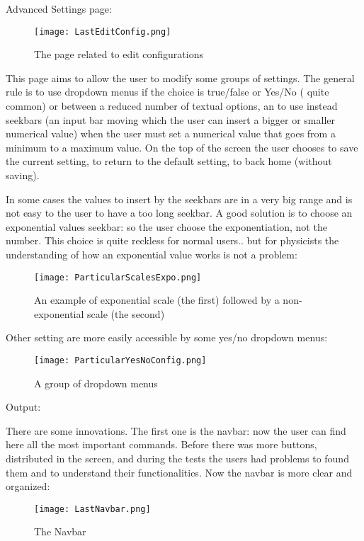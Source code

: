 Advanced Settings page:

\begin{figure}[H]
\centering
\texttt{[image: LastEditConfig.png]} 
\caption{The page related to edit configurations}
\end{figure}   

This page aims to allow the user to modify some groups of settings. The general rule is to use dropdown menus if the choice is true/false or Yes/No (	quite common) or between a reduced number of textual options, an to use instead  seekbars (an input bar moving which the user can insert a bigger or smaller numerical value) when the user must set a numerical value that goes from a minimum to a maximum value. On the top of the screen the user chooses to save the current setting, to return to the default setting, to back home (without saving).    

In some cases the values to insert by the seekbars are in a very big range and is not easy to the user to have a too long seekbar. A good solution is to choose an exponential values seekbar: so the user choose the exponentiation, not the number. This choice is quite reckless for normal users.. but for physicists the understanding of how an exponential value works is not a problem:

\begin{figure}[H]
\centering
\texttt{[image: ParticularScalesExpo.png]} 
\caption{ An example of exponential scale (the first) followed by a non-exponential scale (the second) }
\end{figure}  

Other setting are more easily accessible by some yes/no dropdown menus:


\begin{figure}[H]
\centering
\texttt{[image: ParticularYesNoConfig.png]} 
\caption{ A group of dropdown menus }
\end{figure}  

\newpage

Output: 

There are some innovations. The first one is the navbar: now the user can find here all the most important commands. Before there was more buttons, distributed in the screen, and during the tests the users had problems to found them and to understand their functionalities. Now the navbar is more clear and organized:

\begin{figure}[H]
\centering
\texttt{[image: LastNavbar.png]} 
\caption{The Navbar}
\end{figure}  



